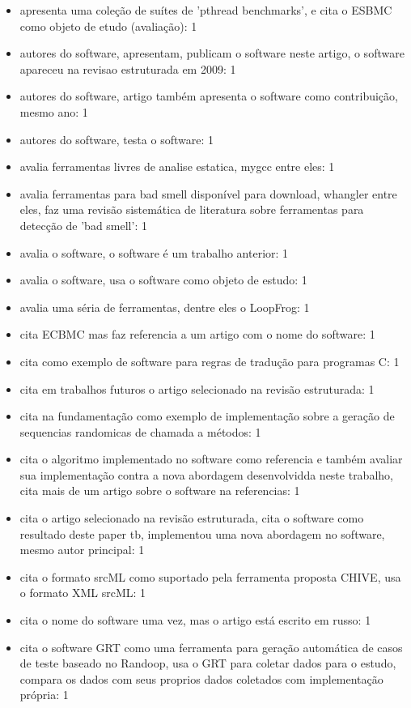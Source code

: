 \begin{itemize}
\item apresenta uma coleção de suítes de 'pthread benchmarks', e cita o ESBMC como objeto de etudo (avaliação): 1
\item autores do software, apresentam, publicam o software neste artigo, o software apareceu na revisao estruturada em 2009: 1
\item autores do software, artigo também apresenta o software como contribuição, mesmo ano: 1
\item autores do software, testa o software: 1
\item avalia ferramentas livres de analise estatica, mygcc entre eles: 1
\item avalia ferramentas para bad smell disponível para download, whangler entre eles, faz uma revisão sistemática de literatura sobre ferramentas para detecção de 'bad smell': 1
\item avalia o software, o software é um trabalho anterior: 1
\item avalia o software, usa o software como objeto de estudo: 1
\item avalia uma séria de ferramentas, dentre eles o LoopFrog: 1
\item cita ECBMC mas faz referencia a um artigo com o nome do software: 1
\item cita como exemplo de software para regras de tradução para programas C: 1
\item cita em trabalhos futuros o artigo selecionado na revisão estruturada: 1
\item cita na fundamentação como exemplo de implementação sobre a geração de sequencias randomicas de chamada a métodos: 1
\item cita o algoritmo implementado no software como referencia e também avaliar sua implementação contra a nova abordagem desenvolvidda neste trabalho, cita mais de um artigo sobre o software na referencias: 1
\item cita o artigo selecionado na revisão estruturada, cita o software como resultado deste paper tb, implementou uma nova abordagem no software, mesmo autor principal: 1
\item cita o formato srcML como suportado pela ferramenta proposta CHIVE, usa o formato XML srcML: 1
\item cita o nome do software uma vez, mas o artigo está escrito em russo: 1
\item cita o software GRT como uma ferramenta para geração automática de casos de teste baseado no Randoop, usa o GRT para coletar dados para o estudo, compara os dados com seus proprios dados coletados com implementação própria: 1

\end{itemize}
